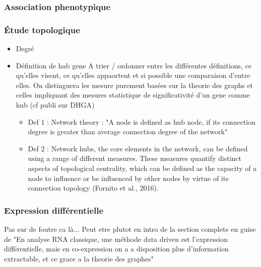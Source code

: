 \subsubsection{Association phenotypique}


\subsubsection{Étude topologique}


\begin{itemize}
    \item Degré
    \item Définition de hub gene
    A trier / ordonner entre les différentes définitions, ce qu'elles visent, ce qu'elles appaortent et si possible une comparaison d'entre elles. On distinguera les mesure purement basées sur la theorie des graphs et celles impliquant des mesures statistique de significativité d'un gene comme hub (cf publi sur DHGA)
    \begin{itemize}
        \item Def 1 : Network theory : "A node is defined as hub node, if its connection degree is greater than average connection degree of the network" %
        \item Def 2 : Network hubs, the core elements in the network, can be defined using a range of different measures. These measures quantify distinct aspects of topological centrality, which can be defined as the capacity of a node to influence or be influenced by other nodes by virtue of its connection topology (Fornito et al., 2016).
    \end{itemize}
\end{itemize}
\subsubsection{Expression différentielle}
Pas sur de foutre ca là... Peut etre plutot en intro de la section complete en guise de "En analyse RNA classique, une méthode data driven est l'expression différentielle, mais en co-expression on a a disposition plus d'information extractable, et ce grace a la theorie des graphes" 

